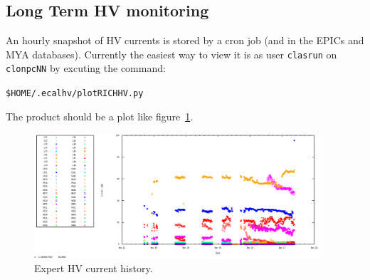 \documentclass[12pt]{article}
\begin{document}
   \subsection{Long Term HV monitoring}

   An hourly snapshot of HV currents is stored by a cron job (and in the EPICs and MYA databases).  Currently the easiest way to view it is as user \texttt{clasrun} on \texttt{clonpcNN} by excuting the command:
   \begin{center}
   \texttt{\$HOME/.ecalhv/plotRICHHV.py}
   \end{center}
The product should be a plot like figure~\ref{HVhistory}.

\begin{figure}[htbp] \centering
\includegraphics[width=0.95\textwidth]{pics/ECALHVCURRENTS_2014_12_20.png}
\caption{ \label{HVhistory} Expert HV current history.}
\end{figure}



\end{document}
